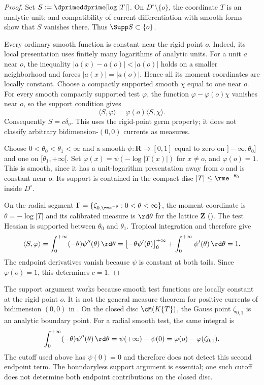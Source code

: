 \begin{proof}
Set $S:=\dprimeddprime[\log|T|]$. On
$D^\circ\setminus\{o\}$, the coordinate $T$ is an analytic unit;
 and compatibility of current differentiation
with smooth forms show that $S$ vanishes there. Thus $\Supp S\subset\{o\}$.

Every ordinary smooth function is constant near the rigid point $o$.
Indeed, its local presentation uses finitely many logarithms of analytic
units. For a unit $a$ near $o$, the inequality
$|a(x)-a(o)|<|a(o)|$ holds on a smaller neighborhood and forces
$|a(x)|=|a(o)|$. Hence all its moment coordinates are locally constant.
Choose a compactly supported smooth $\chi$ equal to one near $o$.
For every smooth compactly supported test $\varphi$, the function
$\varphi-\varphi(o)\chi$ vanishes near $o$, so the support condition gives
\[
 \langle S,\varphi\rangle=\varphi(o)\langle S,\chi\rangle.
\]
Consequently $S=c\delta_o$. This uses the rigid-point germ property;
it does not classify arbitrary bidimension-$(0,0)$ currents as measures.

Choose $0<\theta_0<\theta_1<\infty$ and a smooth
$\psi:\mathbf R\to[0,1]$ equal to zero on $]-\infty,\theta_0]$ and
one on $[\theta_1,+\infty[$. Set
$\varphi(x)=\psi(-\log|T(x)|)$ for $x\ne o$, and $\varphi(o)=1$.
This is smooth, since it has a unit-logarithm presentation away from $o$
and is constant near $o$. Its support is contained in the compact disc
$|T|\leq\rme^{-\theta_0}$ inside $D^\circ$.

On the radial segment $\Gamma=\{\zeta_{0,\rme^{-\theta}}:0<\theta<\infty\}$,
the moment coordinate is $\theta=-\log|T|$ and its calibrated measure is
$\rd\theta$ for the lattice $\mathbf Z$
(). The test Hessian is supported between
$\theta_0$ and $\theta_1$. Tropical integration and
 therefore give
\[
 \langle S,\varphi\rangle
 =\int_0^{+\infty}(-\theta)\psi''(\theta)\,\rd\theta
 =\bigl[-\theta\psi'(\theta)\bigr]_0^{+\infty}
   +\int_0^{+\infty}\psi'(\theta)\,\rd\theta
 =1.
\]
The endpoint derivatives vanish because $\psi$ is constant at both tails.
Since $\varphi(o)=1$, this determines $c=1$.
\end{proof}

\begin{remark}
\label{rem:ch15-one-test-function}
The support argument works because smooth test functions are locally
constant at the rigid point $o$. It is not the general measure theorem
for positive currents of bidimension $(0,0)$ in .
On the closed disc $\cM(K\{T\})$, the Gauss point $\zeta_{0,1}$ is an
analytic boundary point. For a radial smooth test, the same integral is
\[
 \int_0^{+\infty}(-\theta)\psi''(\theta)\,\rd\theta
 =\psi(+\infty)-\psi(0)
 =\varphi(o)-\varphi(\zeta_{0,1}).
\]
The cutoff used above has $\psi(0)=0$ and therefore does not detect this
second endpoint term. The boundaryless support argument is essential;
one such cutoff does not determine both endpoint contributions on the
closed disc.
\end{remark}

